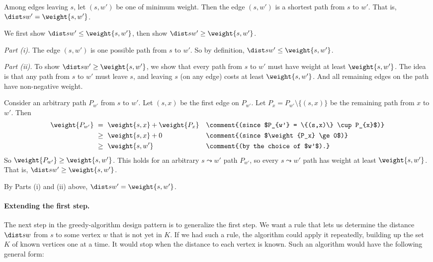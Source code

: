 \begin{lemma}\label{greedy: first}
  Among edges leaving $s$,
  let $(s,w')$ be one of minimum weight.
  Then the edge $(s,w')$ is a shortest path from $s$ to $w'$.
  That is, $\dist s {w'} = \weight {s, w'}$. 
\end{lemma}
\begin{shortFormProof}
  We first show $\dist s {w'} \le \weight {s, w'}$,
  then show $\dist s {w'} \ge \weight {s, w'}$.
  
  \smallskip\noindent
  \emph{Part (i).}
  The edge $(s, w')$ is one possible path from $s$ to $w'$.
  So by definition, $\dist s {w'} \le \weight {s, w'}$.

  \smallskip\noindent
  \emph{Part (ii).}
  To show $\dist s {w'} \ge \weight {s, w'}$,
  we show that every path from $s$ to $w'$
  must have weight at least $\weight {s, w'}$.
  The idea is that any path from $s$ to $w'$
  must leave $s$, and leaving $s$ (on any edge)
  costs at least $\weight {s, w'}$.
  And all remaining edges on the path have non-negative weight.
    
  Consider an arbitrary path $P_{w'}$ from $s$ to $w'$.
  Let $(s,x)$ be the first edge on $P_{w'}$.
  Let $P_x = P_{w'}\setminus \{(s,x)\}$ be the remaining path from $x$ to $w'$.
  Then
  \begin{align*}
    \weight {P_{w'}}~&=~\weight {s,x} + \weight {P_x}
    && \comment{(since $P_{w'} = \{(s,x)\} \cup P_{x}$)}
    \\
              & \ge~\weight {s,x} + 0
    && \comment{(since $\weight {P_x} \ge 0$)}
    \\
              & \ge~\weight {s,w'}
    && \comment{(by the choice of $w'$).}
  \end{align*}
  So $\weight {P_{w'}} \ge \weight {s, w'}$.
  This holds for an arbitrary $s\leadsto w'$ path $P_{w'}$,
  so every $s\leadsto w'$ path has weight at least $\weight {s, w'}$.
  That is, $\dist s {w'} \ge  \weight {s, w'}$.

  By Parts (i) and (ii) above, $\dist s {w'} = \weight {s, w'}$.
\end{shortFormProof}


\paragraph{Extending the first step.}
The next step in the greedy-algorithm design pattern
is to generalize the first step.  We want a rule that lets us determine the distance $\dist s w$
from $s$ to some vertex $w$ that is not yet in $K$.
If we had such a rule, the algorithm could apply it repeatedly,
building up the set $K$ of known vertices one at a time.
It would stop when the distance to each vertex is known.
Such an algorithm would have the following general form:

